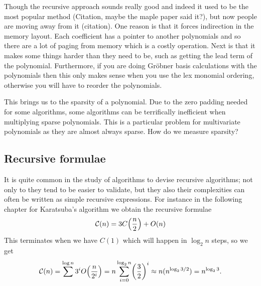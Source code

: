 Though the recursive approach sounds really good and indeed it used to be the most popular method (Citation, maybe the maple paper said it?), but now people are moving away from it (citation). One reason is that it forces indirection in the memory layout. Each coefficient has a pointer to another polynomials and so there are a lot of paging from memory which is a costly operation. Next is that it makes some things harder than they need to be, such as getting the lead term of the polynomial. Furthermore, if you are doing Gr\"{o}bner basis calculations with the polynomials then this only makes sense when you use the lex monomial ordering, otherwise you will have to reorder the polynomials.

This brings us to the sparsity of a polynomial. Due to the zero padding needed for some algorithms, some algorithms can be terrifically inefficient when multiplying sparse polynomials. This is a particular problem for multivariate polynomials as they are almost always sparse. How do we measure sparsity? 

\subsection{Recursive formulae}%
\label{sub:Recursive forumulae}

It is quite common in the study of algorithms to devise recursive algorithms; not only to they tend to be easier to validate, but they also their complexities can often be written as simple recursive expressions. For instance in the following chapter for Karatsuba's algorithm we obtain the recursive formulae
\[
    \M{C}(n) = 3C\bb{\frac{n}{2}} + O(n)
\]
This terminates when we have $C(1)$ which will happen in $\log_2 n$ steps, so we get
\[
    \M{C}(n) = \sum^{\log n} 3^i O\bb{\frac{n}{2^i}} = n\sum^{\log_2 n}_{i=0} \bb{\frac{3}{2}}^i \approx n(n^{\log_2 3/2}) = n^{\log_2 3}.
\]
